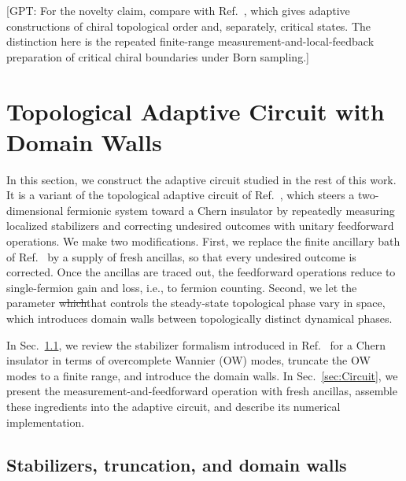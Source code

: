 \documentclass[aps,prb,10pt,twocolumn,superscriptaddress,longbibliography,floatfix]{revtex4-2}
\newcommand{\GPT}[1]{{\color{magenta}[GPT: #1]}}
\newcommand{\claudeadd}[1]{{\color{orange}#1}}
\newcommand{\claudedel}[1]{{\color{orange}\sout{#1}}}
\begin{document}
\GPT{For the novelty claim, compare with Ref.~\cite{LuLessaKimHsieh2022}, which gives adaptive constructions of chiral topological order and, separately, critical states. The distinction here is the repeated finite-range measurement-and-local-feedback preparation of critical chiral boundaries under Born sampling.}

\section{Topological Adaptive Circuit with Domain Walls}
\label{sec:Model}

In this section, we construct the adaptive circuit studied in the rest of this work. It is a variant of the topological adaptive circuit of Ref.~\cite{BhuiyanPanJian2026}, which steers a two-dimensional fermionic system toward a Chern insulator by repeatedly measuring localized stabilizers and correcting undesired outcomes with unitary feedforward operations. We make two modifications. First, we replace the finite ancillary bath of Ref.~\cite{BhuiyanPanJian2026} by a supply of fresh ancillas, so that every undesired outcome is corrected. Once the ancillas are traced out, the feedforward operations reduce to single-fermion gain and loss, i.e., to fermion counting. Second, we let the parameter \claudedel{which}\claudeadd{that} controls the steady-state topological phase vary in space, which introduces domain walls between topologically distinct dynamical phases.

In Sec.~\ref{sec:Stabilizers}, we review the stabilizer formalism introduced in Ref.~\cite{BhuiyanPanJian2026} for a Chern insulator in terms of overcomplete Wannier (OW) modes, truncate the OW modes to a finite range, and introduce the domain walls. In Sec.~\ref{sec:Circuit}, we present the measurement-and-feedforward operation with fresh ancillas, assemble these ingredients into the adaptive circuit, and describe its numerical implementation.



\subsection{Stabilizers, truncation, and domain walls}
\label{sec:Stabilizers}
\end{document}
